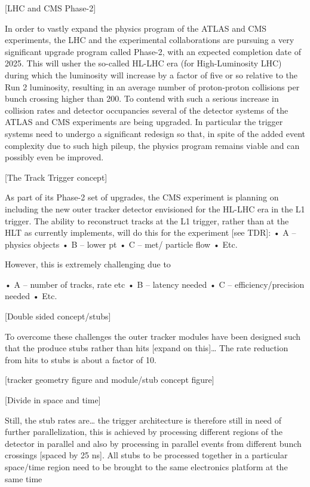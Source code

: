 [LHC and CMS Phase-2]

In order to vastly expand the physics program of the ATLAS and CMS experiments, the LHC and the experimental collaborations are pursuing a very significant upgrade program called Phase-2, with an expected completion date of 2025. This will usher the so-called HL-LHC era (for High-Luminosity LHC) during which the luminosity will increase by a factor of five or so relative to the Run 2 luminosity, resulting in an average number of proton-proton collisions per bunch crossing higher than 200. To contend with such a serious increase in collision rates and detector occupancies several of the detector systems of the ATLAS and CMS experiments are being upgraded. In particular the trigger systems need to undergo a significant redesign so that, in spite of the added event complexity due to such high pileup, the physics program remains viable and can possibly even be improved. 

[The Track Trigger concept]

As part of its Phase-2 set of upgrades, the CMS experiment is planning on including the new outer tracker detector envisioned for the HL-LHC era in the L1 trigger. The ability to reconstruct tracks at the L1 trigger, rather than at the HLT as currently implements, will do this for the experiment [see TDR]:
•	A –physics objects
•	B – lower pt
•	C – met/ particle flow 
•	Etc.

However, this is extremely challenging due to

•	A – number of tracks, rate etc
•	B – latency needed
•	C – efficiency/precision needed
•	Etc.

[Double sided concept/stubs]

To overcome these challenges the outer tracker modules have been designed such that the produce stubs rather than hits [expand on this]… 
The rate reduction from hits to stubs is about a factor of 10. 

[tracker geometry figure and module/stub concept figure]

[Divide in space and time]

Still, the stub rates are… the trigger architecture is therefore still in need of further parallelization, this is achieved by processing different regions of the detector in parallel and also by processing in parallel events from different bunch crossings [spaced by 25 ns]. All stubs to be processed together in a particular space/time region need to be brought to the same electronics platform at the same time

